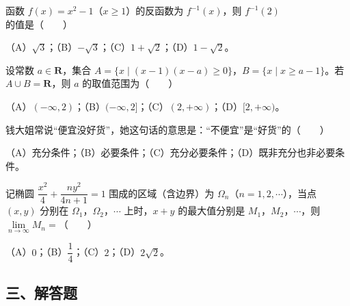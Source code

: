\begin{question}
函数 $f(x)=x^2-1$（$x\geqslant 1$）的反函数为 $f^{-1}(x)$，则 $f^{-1}(2)$ 的值是\mbox{（　　）}

（A）$\sqrt3$；（B）$-\sqrt3$；（C）$1+\sqrt2$；（D）$1-\sqrt2$。

\end{question}
\begin{question}
设常数 $a\in\mathbf R$，集合 $A=\{x\mid (x-1)(x-a)\geqslant 0\}$，$B=\{x\mid x\geqslant a-1\}$。若 $A\cup B=\mathbf R$，则 $a$ 的取值范围为\mbox{（　　）}

（A）$(-\infty,2)$；（B）$(-\infty,2]$；（C）$(2,+\infty)$；（D）$[2,+\infty)$。

\end{question}
\begin{question}
钱大姐常说“便宜没好货”，她这句话的意思是：“不便宜”是“好货”的\mbox{（　　）}

（A）充分条件；（B）必要条件；（C）充分必要条件；（D）既非充分也非必要条件。

\end{question}
\begin{question}
记椭圆 $\dfrac{x^2}{4}+\dfrac{ny^2}{4n+1}=1$ 围成的区域（含边界）为 $\Omega_n$（$n=1,2,\cdots$），当点 $(x,y)$ 分别在 $\Omega_1$，$\Omega_2$，$\cdots$ 上时，$x+y$ 的最大值分别是 $M_1$，$M_2$，$\cdots$，则 $\lim\limits_{n\to\infty}M_n=$\mbox{（　　）}

（A）$0$；（B）$\dfrac14$；（C）$2$；（D）$2\sqrt2$。

\end{question}
\begingroup
\renewcommand{\gkpart}[1]{\Needspace{0.4\textheight}\subsection*{#1}\nopagebreak}
\gkpart{三、解答题}
\endgroup


